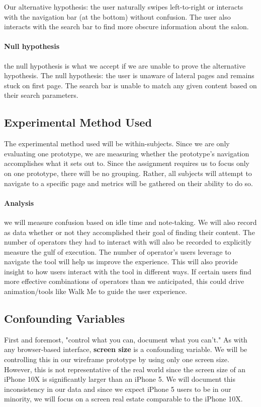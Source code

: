 Our alternative hypothesis: the user naturally swipes left-to-right or interacts with the navigation bar (at the bottom) without confusion. The user also interacts with the search bar to find more obscure information about the salon.

\paragraph{Null hypothesis} the null hypothesis is what we accept if we are unable to prove the alternative hypothesis. The null hypothesis: the user is unaware of lateral pages and remains stuck on first page. The search bar is unable to match any given content based on their search parameters.

\subsection{Experimental Method Used}
The experimental method used will be within-subjects. Since we are only evaluating one prototype, we are measuring whether the prototype's navigation accomplishes what it sets out to. Since the assignment requires us to focus only on one prototype, there will be no grouping. Rather, all subjects will attempt to navigate to a specific page and metrics will be gathered on their ability to do so.

\paragraph{Analysis} we will measure confusion based on idle time and note-taking. We will also record as data whether or not they accomplished their goal of finding their content. The number of operators they had to interact with will also be recorded to explicitly measure the gulf of execution. The number of operator's users leverage to navigate the tool will help us improve the experience. This will also provide insight to how users interact with the tool in different ways. If certain users find more effective combinations of operators than we anticipated, this could drive animation/tools like Walk Me to guide the user experience.

\subsection{Confounding Variables}
First and foremost, "control what you can, document what you can't." As with any browser-based interface, \textbf{screen size} is a confounding variable. We will be controlling this in our wireframe prototype by using only one screen size. However, this is not representative of the real world since the screen size of an iPhone 10X is significantly larger than an iPhone 5. We will document this inconsistency in our data and since we expect iPhone 5 users to be in our minority, we will focus on a screen real estate comparable to the iPhone 10X.

